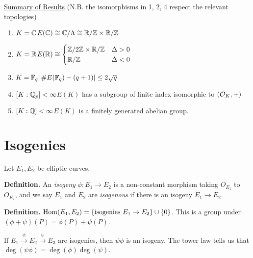 \documentclass[10pt,a4paper]{article}
\begin{document}
\underline{Summary of Results} (N.B. the isomorphisms in 1, 2, 4 respect the relevant topologies)
\begin{enumerate}
  \item $K = \mathbb{C}$\hspace{2cm}$E(\mathbb{C}) \cong \mathbb{C}/\Lambda \cong \mathbb{R}/\mathbb{Z}\times \mathbb{R}/\mathbb{Z}$
  \item $K = \mathbb{R}$\hspace{2cm}$E(\mathbb{R}) \cong \begin{cases} \mathbb{Z}/2\mathbb{Z} \times \mathbb{R}/\mathbb{Z} & \Delta > 0 \\ \mathbb{R}/\mathbb{Z} & \Delta < 0\end{cases}$
  \item $K = \mathbb{F}_q$\hspace{1.9cm}$|\#E(\mathbb{F}_q) - (q+1)|\leq 2\sqrt{q}$
  \item $[K:\mathbb{Q}_p]<\infty$\hspace{1cm}$E(K)$ has a subgroup of finite index isomorphic to $(\mathcal{O}_K, +)$
  \item $[K:\mathbb{Q}]<\infty$\hspace{1.15cm}$E(K)$ is a finitely generated abelian group.
\end{enumerate}

\section{Isogenies}
Let $E_1, E_2$ be elliptic curves.

\textbf{Definition.} An \emph{isogeny} $\phi:E_1 \to E_2$ is a non-constant morphism taking $O_{E_1}$ to $O_{E_2}$, and we say $E_1$ and $E_2$ are \emph{isogenous} if there is an isogeny $E_1 \to E_2$.

\textbf{Definition.} $\operatorname{Hom}(E_1, E_2) = \{\text{isogenies } E_1 \to E_2\}\cup\{0\}$. This is a group under $(\phi+\psi)(P) = \phi(P)+\psi(P)$.

If $E_1 \xrightarrow{\phi} E_2 \xrightarrow{\psi} E_3$ are isogenies, then $\psi\phi$ is an isogeny. The tower law tells us that $\deg(\psi\phi) = \deg(\phi)\deg(\psi)$.
\end{document}
